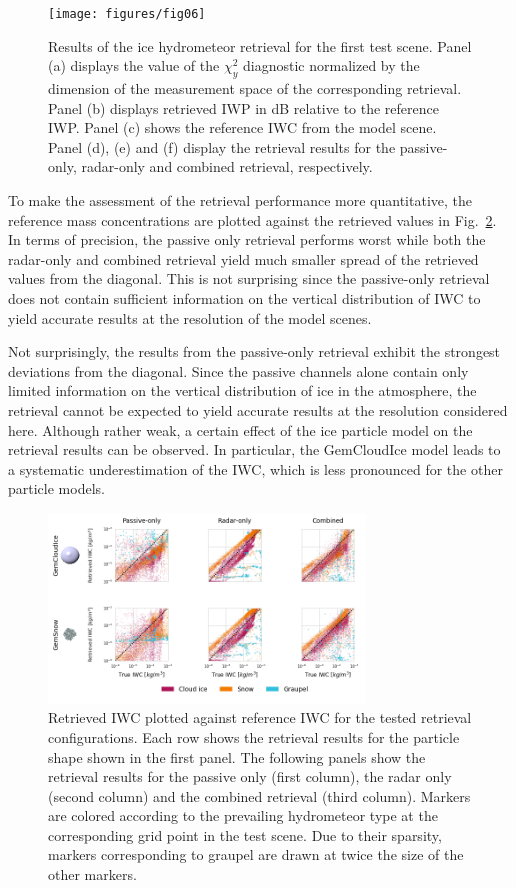 \documentclass[journal abbreviation, manuscript]{copernicus}
\begin{document}
\begin{figure}
\centering
\texttt{[image: figures/fig06]}
\caption{Results of the ice hydrometeor retrieval for the first test scene.
  Panel (a) displays the value of the $\chi^2_y$ diagnostic normalized by the
  dimension of the measurement space of the corresponding retrieval. Panel (b)
  displays retrieved IWP in dB relative to the reference IWP. Panel (c) shows
  the reference IWC from the model scene. Panel (d), (e) and (f) display the
  retrieval results for the passive-only, radar-only and combined retrieval,
  respectively.}
\label{fig:results_a}
\end{figure}

To make the assessment of the retrieval performance more quantitative, the
reference mass concentrations are plotted against the retrieved values in
Fig.~\ref{fig:results_scatter_a}. In terms of precision, the passive
only retrieval performs worst while both the radar-only and combined retrieval
yield much smaller spread of the retrieved values from the diagonal. This
is not surprising since the passive-only retrieval does not contain sufficient
information on the vertical distribution of IWC to yield accurate results
at the resolution of the model scenes.

Not surprisingly, the results from the
passive-only retrieval exhibit the strongest deviations from the diagonal. Since
the passive channels alone contain only limited information on the vertical
distribution of ice in the atmosphere, the retrieval cannot be expected to yield
accurate results at the resolution considered here. Although rather weak, a
certain effect of the ice particle model on the retrieval results can be
observed. In particular, the GemCloudIce model leads to a systematic
underestimation of the IWC, which is less pronounced for the other
particle models.

\begin{figure}
\centering \includegraphics[width = 0.75\textwidth]{../plots/results_scatter_a}
\caption{Retrieved IWC plotted against reference IWC for the tested retrieval
  configurations. Each row shows the retrieval results for the particle shape
  shown in the first panel. The following panels show the retrieval results for
  the passive only (first column), the radar only (second column) and the
  combined retrieval (third column). Markers are colored according to the
  prevailing hydrometeor type at the corresponding grid point in the test
  scene. Due to their sparsity, markers corresponding to graupel are drawn at
  twice the size of the other markers.}
\label{fig:results_scatter_a}
\end{figure}
\end{document}
